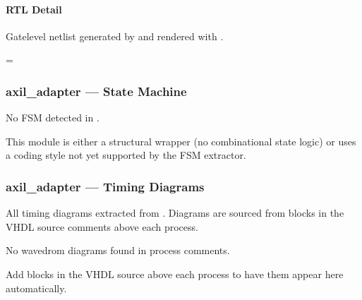 \documentclass[letterpaper,10pt,english]{sphinxmanual}
\begin{document}
\paragraph{RTL Detail}
\label{\detokenize{modules/axil_adapter/block:rtl-detail}}
\sphinxAtStartPar
Gate\sphinxhyphen{}level netlist generated by  and rendered with .

\begin{landscape}
\makeatletter
\spx@image@maxheight=\dimexpr{}\baselineskip\relax
\makeatother


\end{landscape}

\sphinxstepscope


\subsubsection{axil\_adapter — State Machine}
\label{\detokenize{modules/axil_adapter/fsm:axil-adapter-state-machine}}\label{\detokenize{modules/axil_adapter/fsm::doc}}
\sphinxAtStartPar
No FSM detected in .

\sphinxAtStartPar
This module is either a structural wrapper (no combinational
state logic) or uses a coding style not yet supported by the
FSM extractor.

\sphinxstepscope


\subsubsection{axil\_adapter — Timing Diagrams}
\label{\detokenize{modules/axil_adapter/timing:axil-adapter-timing-diagrams}}\label{\detokenize{modules/axil_adapter/timing::doc}}
\sphinxAtStartPar
All timing diagrams extracted from .
Diagrams are sourced from  blocks in the VHDL
source comments above each process.

\sphinxAtStartPar
No wavedrom diagrams found in process comments.

\sphinxAtStartPar
Add  blocks in the VHDL source above each
process to have them appear here automatically.
\end{document}
